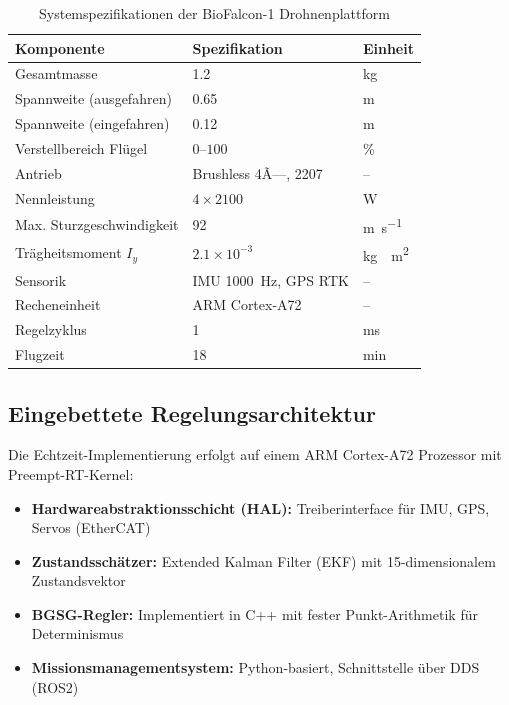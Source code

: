 ﻿\documentclass[12pt,a4paper]{article}
\theoremstyle{remark}
\begin{document}
	\begin{table}[H]
		\centering
		\caption{Systemspezifikationen der BioFalcon-1 Drohnenplattform}
		\label{tab:hardware}
		\begin{tabular}{lll}
			\toprule
			\textbf{Komponente} & \textbf{Spezifikation} & \textbf{Einheit} \\
			\midrule
			Gesamtmasse & 1.2 & \si{\kg} \\
			Spannweite (ausgefahren) & 0.65 & \si{\m} \\
			Spannweite (eingefahren) & 0.12 & \si{\m} \\
			Verstellbereich Flügel & $0$--$100$ & \si{\percent} \\
			Antrieb & Brushless 4Ã—, 2207 & -- \\
			Nennleistung & $4 \times 2100$ & \si{\W} \\
			Max. Sturzgeschwindigkeit & 92 & \si{\m\per\second} \\
			Trägheitsmoment $I_y$ & $2.1 \times 10^{-3}$ & \si{\kg\cdot\m^2} \\
			Sensorik & IMU 1000~Hz, GPS RTK & -- \\
			Recheneinheit & ARM Cortex-A72 & -- \\
			Regelzyklus & 1 & \si{\ms} \\
			Flugzeit & 18 & \si{\minute} \\
			\bottomrule
		\end{tabular}
	\end{table}
	
	\subsection{Eingebettete Regelungsarchitektur}
	
	Die Echtzeit-Implementierung erfolgt auf einem ARM Cortex-A72 Prozessor mit Preempt-RT-Kernel:
	
	\begin{itemize}
		\item \textbf{Hardwareabstraktionsschicht (HAL):} Treiberinterface für IMU, GPS, Servos (EtherCAT)
		\item \textbf{Zustandsschätzer:} Extended Kalman Filter (EKF) mit 15-dimensionalem Zustandsvektor
		\item \textbf{BGSG-Regler:} Implementiert in C++ mit fester Punkt-Arithmetik für Determinismus
		\item \textbf{Missionsmanagementsystem:} Python-basiert, Schnittstelle über DDS (ROS2)
	\end{itemize}
	
\end{document}
